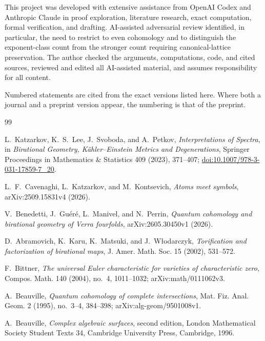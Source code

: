 \documentclass[11pt]{article}
\numberwithin{equation}{section}
\theoremstyle{definition}
\theoremstyle{remark}
\begin{document}
This project was developed with extensive assistance from OpenAI Codex and
Anthropic Claude in proof exploration, literature research, exact computation,
formal verification, and drafting.  AI-assisted adversarial review identified,
in particular, the need to restrict to even cohomology and to distinguish
the exponent-class count from the stronger count requiring canonical-lattice
preservation.
The author checked the arguments, computations, code, and cited sources,
reviewed and edited all AI-assisted material, and assumes responsibility for
all content.

\footnotesize
\noindent Numbered statements are cited from the exact versions listed here.
Where both a journal and a preprint version appear, the numbering is that of
the preprint.

\begin{thebibliography}{99}

L.~Katzarkov, K.~S.~Lee, J.~Svoboda, and A.~Petkov,
\emph{Interpretations of Spectra}, in
\emph{Birational Geometry, K\"ahler--Einstein Metrics and Degenerations},
Springer Proceedings in Mathematics \& Statistics 409 (2023), 371--407;
\href{https://doi.org/10.1007/978-3-031-17859-7_20}{doi:10.1007/978-3-031-17859-7\_20}.

L.~F.~Cavenaghi, L.~Katzarkov, and M.~Kontsevich,
\emph{Atoms meet symbols}, arXiv:2509.15831v4 (2026).

V.~Benedetti, J.~Gu\'er\'e, L.~Manivel, and N.~Perrin,
\emph{Quantum cohomology and birational geometry of Verra fourfolds},
arXiv:2605.30450v1 (2026).


D.~Abramovich, K.~Karu, K.~Matsuki, and J.~W{\l}odarczyk,
\emph{Torification and factorization of birational maps},
J. Amer. Math. Soc. 15 (2002), 531--572.

\begingroup\raggedright
F.~Bittner,
\emph{The universal Euler characteristic for varieties of characteristic
zero},
Compos. Math. 140 (2004), no.~4, 1011--1032;
arXiv:math/0111062v3.\par
\endgroup

A.~Beauville,
\emph{Quantum cohomology of complete intersections},
Mat. Fiz. Anal. Geom. 2 (1995), no.~3--4, 384--398;
arXiv:alg-geom/9501008v1.

A.~Beauville,
\emph{Complex algebraic surfaces}, second edition,
London Mathematical Society Student Texts 34,
Cambridge University Press, Cambridge, 1996.


\end{thebibliography}
\end{document}
